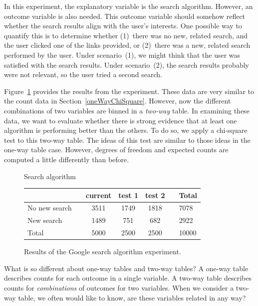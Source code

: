 In this experiment, the explanatory variable is the search algorithm. However, an outcome variable is also needed. This outcome variable should somehow reflect whether the search results align with the user's interests. One possible way to quantify this is to determine whether (1)~there was no new, related search, and the user clicked one of the links provided, or (2)~there was a new, related search performed by the user. Under scenario~(1), we might think that the user was satisfied with the search results. Under scenario~(2), the search results probably were not relevant, so the user tried a second search.

Figure~\ref{googleSearchAlgorithmByAlgorithmAndPerformanceWithTotals} provides the results from the experiment. These data are very similar to the count data in Section~\ref{oneWayChiSquare}. However, now the different combinations of two variables are binned in a \emph{two-way} table. In examining these data, we want to evaluate whether there is strong evidence that at least one algorithm is performing better than the others. To do so, we apply a chi-square test to this two-way table. The ideas of this test are similar to those ideas in the one-way table case. However, degrees of freedom and expected counts are computed a little differently than before.

\begin{figure}[h]
\centering
\quad \quad \quad \quad Search algorithm \\
\begin{tabular}{ll ccc ll}
\hline
 & \hspace{1mm} & current & test 1 & test 2 & \hspace{1mm} & Total \\
\hline
No new search				   & & 3511    & 1749 & 1818 & 				& 7078 \\
New search				   & & 1489    & 751	& 682    &				& 2922 \\
\hline
Total						   & & 5000    & 2500 & 2500 & 				& 10000 \\
\hline
\end{tabular}
\caption{Results of the Google search algorithm experiment.}
\label{googleSearchAlgorithmByAlgorithmAndPerformanceWithTotals}
\end{figure}

\begin{onebox}{What is so different about one-way tables and two-way tables?}
A one-way table describes counts for each outcome in a single variable. A two-way table describes counts for \emph{combinations} of outcomes for two variables. When we consider a two-way table, we often would like to know, are these variables related in any way?\end{onebox}

